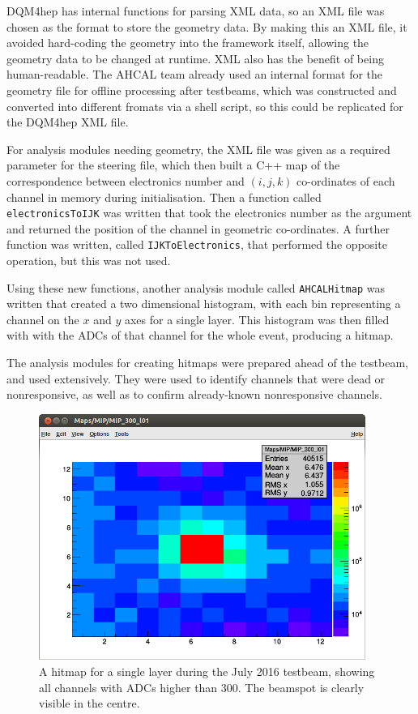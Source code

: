 \acrshort{DQM4hep} has internal functions for parsing \acrshort{XML} data, so an \acrshort{XML} file was chosen as the format to store the geometry data. By making this an \acrshort{XML} file, it avoided hard-coding the geometry into the framework itself, allowing the geometry data to be changed at runtime. \acrshort{XML} also has the benefit of being human-readable. The AHCAL team already used an internal format for the geometry file for offline processing after testbeams, which was constructed and converted into different fromats via a  shell script, so this could be replicated for the \acrshort{DQM4hep} \acrshort{XML} file.

For analysis modules needing geometry, the \acrshort{XML} file was given as a required parameter for the steering file, which then built a C++ map of the correspondence between electronics number and $(i,j,k)$ co-ordinates of each channel in memory during initialisation. Then a function called \texttt{electronicsToIJK} was written that took the electronics number as the argument and returned the position of the channel in geometric co-ordinates. A further function was written, called \texttt{IJKToElectronics}, that performed the opposite operation, but this was not used. 

Using these new functions, another analysis module called \texttt{AHCALHitmap} was written that created a two dimensional histogram, with each bin representing a channel on the $x$ and $y$ axes for a single layer. This histogram was then filled with with the \acrshort{ADC}s of that channel for the whole event, producing a hitmap.

The analysis modules for creating hitmaps were prepared ahead of the testbeam, and used extensively. They were used to identify channels that were dead or nonresponsive, as well as to confirm already-known nonresponsive channels.

\begin{figure}[p]
	\centering
	\includegraphics[width=0.95\textwidth]{../Pictures/AHCALHitmapSingle.png}
	\caption{A hitmap for a single layer during the July 2016 testbeam, showing all channels with \acrshort{ADC}s higher than 300. The beamspot is clearly visible in the centre.}
	\label{figure:aida/july2016/single-hitmap}
\end{figure}

